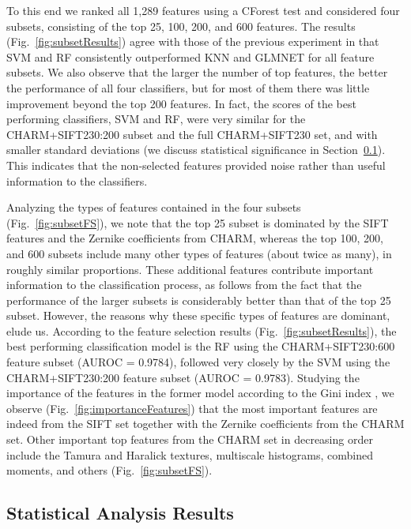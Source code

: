To this end we ranked all 1,289 features using a CForest test \cite{CForest} and considered four subsets, consisting of the top 25, 100, 200, and 600 features. The results (Fig.~\ref{fig:subsetResults}) agree with those of the previous experiment in that SVM and RF consistently outperformed KNN and GLMNET for all feature subsets. We also observe that the larger the number of top features, the better the performance of all four classifiers, but for most of them there was little improvement beyond the top 200 features. In fact, the scores of the best performing classifiers, SVM and RF, were very similar for the CHARM+SIFT230:200 subset and the full CHARM+SIFT230 set, and with smaller standard deviations (we discuss statistical significance in Section~\ref{subsec:experimentalAnalysis}). This indicates that the non-selected features provided noise rather than useful information to the classifiers.

Analyzing the types of features contained in the four subsets (Fig.~\ref{fig:subsetFS}), we note that the top 25 subset is dominated by the SIFT features and the Zernike coefficients from CHARM, whereas the top 100, 200, and 600 subsets include many other types of features (about twice as many), in roughly similar proportions. These additional features contribute important information to the classification process, as follows from the fact that the performance of the larger subsets is considerably better than that of the top 25 subset. However, the reasons why these specific types of features are dominant, elude us. According to the feature selection results (Fig.~\ref{fig:subsetResults}), the best performing classification model is the RF using the CHARM+SIFT230:600 feature subset (AUROC = 0.9784), followed very closely by the SVM using the CHARM+SIFT230:200 feature subset (AUROC = 0.9783). Studying the importance of the features in the former model according to the Gini index \cite{Breiman2001}, we observe (Fig.~\ref{fig:importanceFeatures}) that the most important features are indeed from the SIFT set together with the Zernike coefficients from the CHARM set. Other important top features from the CHARM set in decreasing order include the Tamura and Haralick textures, multiscale histograms, combined moments, and others (Fig.~\ref{fig:subsetFS}).

\subsection{Statistical Analysis Results}
\label{subsec:experimentalAnalysis}

